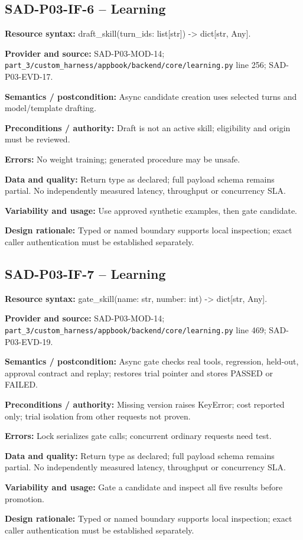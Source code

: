 \documentclass[10pt,letterpaper]{article}
\begin{document}
\subsection{SAD-P03-IF-6 -- Learning}
{\raggedright \textbf{Resource syntax:} draft\_\allowbreak{}skill(\allowbreak{}turn\_\allowbreak{}ids: list[str]) -> dict[str, Any].\par}
\textbf{Provider and source:} SAD-P03-MOD-14; \nolinkurl{part_3/custom_harness/appbook/backend/core/learning.py} line 256; SAD-P03-EVD-17.\par
\textbf{Semantics / postcondition:} Async candidate creation uses selected turns and model/template drafting.\par
\textbf{Preconditions / authority:} Draft is not an active skill; eligibility and origin must be reviewed.\par
\textbf{Errors:} No weight training; generated procedure may be unsafe.\par
\textbf{Data and quality:} Return type as declared; full payload schema remains partial. No independently measured latency, throughput or concurrency SLA.\par
\textbf{Variability and usage:} Use approved synthetic examples, then gate candidate.\par
\textbf{Design rationale:} Typed or named boundary supports local inspection; exact caller authentication must be established separately.\par

\subsection{SAD-P03-IF-7 -- Learning}
{\raggedright \textbf{Resource syntax:} gate\_\allowbreak{}skill(\allowbreak{}name: str, number: int) -> dict[str, Any].\par}
\textbf{Provider and source:} SAD-P03-MOD-14; \nolinkurl{part_3/custom_harness/appbook/backend/core/learning.py} line 469; SAD-P03-EVD-19.\par
\textbf{Semantics / postcondition:} Async gate checks real tools, regression, held-out, approval contract and replay; restores trial pointer and stores PASSED or FAILED.\par
\textbf{Preconditions / authority:} Missing version raises KeyError; cost reported only; trial isolation from other requests not proven.\par
\textbf{Errors:} Lock serializes gate calls; concurrent ordinary requests need test.\par
\textbf{Data and quality:} Return type as declared; full payload schema remains partial. No independently measured latency, throughput or concurrency SLA.\par
\textbf{Variability and usage:} Gate a candidate and inspect all five results before promotion.\par
\textbf{Design rationale:} Typed or named boundary supports local inspection; exact caller authentication must be established separately.\par
\end{document}
